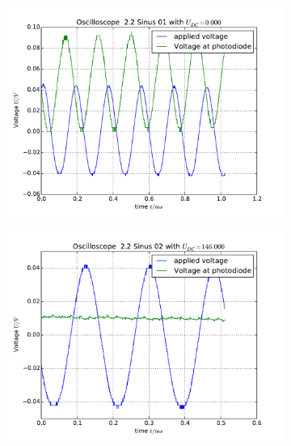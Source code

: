 \begin{figure}
    \begin{subfigure}[b]{\picwidth}
        \includegraphics[width=\textwidth]{analysis/figures/22sinus01}
        \caption{}
    \end{subfigure}\qquad
    \begin{subfigure}[b]{\picwidth}
        \includegraphics[width=\textwidth]{analysis/figures/22sinus02}
        \caption{}
    \end{subfigure}
    \begin{subfigure}[b]{\picwidth}

\end{subfigure}
\end{figure}

